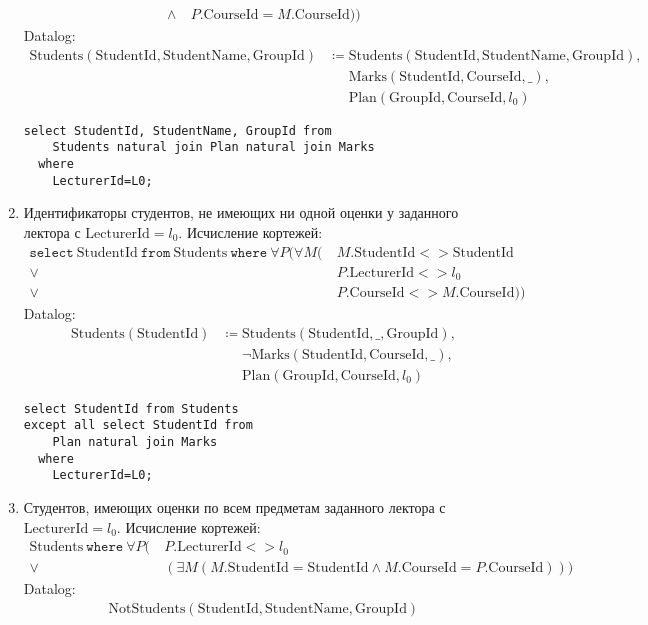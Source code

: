\documentclass{article}
\newcommand{\Students}{\mathrm{Students}}
\newcommand{\StudentId}{\mathrm{StudentId}}
\newcommand{\StudentName}{\mathrm{StudentName}}
\newcommand{\GroupId}{\mathrm{GroupId}}
\newcommand{\CourseId}{\mathrm{CourseId}}
\newcommand{\Plan}{\mathrm{Plan}}
\newcommand{\LecturerId}{\mathrm{LecturerId}}
\newcommand{\Marks}{\mathrm{Marks}}
\newcommand{\select}{\mathtt{select}~}
\newcommand{\from}{~\mathtt{from}~}
\newcommand{\where}{~\mathtt{where}~}
\newcommand{\poloneq}{\mathrel{\phantom{\coloneq}}}
\begin{document}
\begin{enumerate}
\begin{align*}
        \land&\ P.\CourseId = M.\CourseId))
    \end{align*}
    Datalog:
    \begin{align*}
        \Students(\StudentId, \StudentName, \GroupId)
        &\coloneq \Students(\StudentId, \StudentName, \GroupId), \\
        &\poloneq \Marks(\StudentId, \CourseId, \_), \\
        &\poloneq \Plan(\GroupId, \CourseId, l_0)
    \end{align*}
    \begin{verbatim}
select StudentId, StudentName, GroupId from
    Students natural join Plan natural join Marks
  where
    LecturerId=L0;
    \end{verbatim}
    \item Идентификаторы студентов, не имеющих ни одной оценки у заданного
        лектора с $\LecturerId=l_0$.
    Исчисление кортежей:
    \begin{align*}
        \select \StudentId \from \Students \where
        \forall P (\forall M (
        &\  M.\StudentId <> \StudentId \\
        \lor&\ P.\LecturerId <> l_0 \\
        \lor&\ P.\CourseId <> M.\CourseId))
    \end{align*}
    Datalog:
    \begin{align*}
        \Students(\StudentId)
        &\coloneq \Students(\StudentId, \_, \GroupId), \\
        &\poloneq \neg \Marks(\StudentId, \CourseId, \_), \\
        &\poloneq \Plan(\GroupId, \CourseId, l_0)
    \end{align*}
    \begin{verbatim}
select StudentId from Students
except all select StudentId from
    Plan natural join Marks
  where
    LecturerId=L0;
    \end{verbatim}
    \item Студентов, имеющих оценки по всем предметам заданного
        лектора с $\LecturerId=l_0$.
    Исчисление кортежей:
    \begin{align*}
        \Students \where \forall P
        (&\ P.\LecturerId <> l_0\\
        \lor&\ (\exists M (M.\StudentId = \StudentId
        \land M.\CourseId = P.\CourseId)))
    \end{align*}
    Datalog:
    \begin{align*}
        \mathrm{NotStudents}(\StudentId, \StudentName, \GroupId)

\end{align*}
\end{enumerate}
\end{document}
